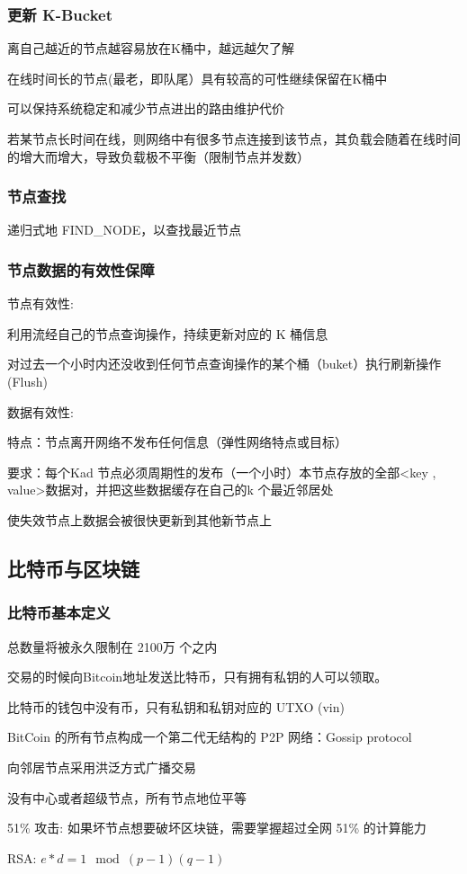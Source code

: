 \documentclass[UTF8,cs4size]{ctexart}
\begin{document}
\subsubsection{更新 K-Bucket}
\begin{compactitem}
  \item 离自己越近的节点越容易放在K桶中，越远越欠了解
  \item 在线时间长的节点(最老，即队尾）具有较高的可性继续保留在K桶中
  \item 可以保持系统稳定和减少节点进出的路由维护代价
  \item 若某节点长时间在线，则网络中有很多节点连接到该节点，其负载会随着在线时间的增大而增大，导致负载极不平衡（限制节点并发数）
\end{compactitem}
\subsubsection{节点查找}
递归式地 FIND\_NODE，以查找最近节点
\subsubsection{节点数据的有效性保障}
节点有效性:
\begin{compactitem}
  \item 利用流经自己的节点查询操作，持续更新对应的 K 桶信息
  \item 对过去一个小时内还没收到任何节点查询操作的某个桶（buket）执行刷新操作 (Flush)
\end{compactitem}

数据有效性:
\begin{compactitem}
  \item 特点：节点离开网络不发布任何信息（弹性网络特点或目标）
  \item 要求：每个Kad 节点必须周期性的发布（一个小时）本节点存放的全部<key , value>数据对，并把这些数据缓存在自己的k 个最近邻居处
  \item 使失效节点上数据会被很快更新到其他新节点上
\end{compactitem}
\subsection{比特币与区块链}
\subsubsection{比特币基本定义}
\begin{compactitem}
  \item 总数量将被永久限制在 2100万 个之内
  \item 交易的时候向Bitcoin地址发送比特币，只有拥有私钥的人可以领取。
  \item 比特币的钱包中没有币，只有私钥和私钥对应的 UTXO (vin)
  \item BitCoin 的所有节点构成一个第二代无结构的 P2P 网络：Gossip protocol
  \item 向邻居节点采用洪泛方式广播交易
  \item 没有中心或者超级节点，所有节点地位平等
  \item 51\% 攻击: 如果坏节点想要破坏区块链，需要掌握超过全网 51\% 的计算能力
  \item RSA: $e*d = 1 \mod (p-1)(q-1)$
\end{compactitem}
\end{document}
